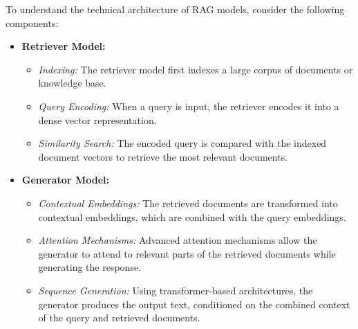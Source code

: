 To understand the technical architecture of RAG models, consider the following components:
\begin{itemize}
    \item \textbf{Retriever Model:}
    \begin{itemize}
        \item \textit{Indexing:} The retriever model first indexes a large corpus of documents or knowledge base.
        \item \textit{Query Encoding:} When a query is input, the retriever encodes it into a dense vector representation.
        \item \textit{Similarity Search:} The encoded query is compared with the indexed document vectors to retrieve the most relevant documents.
    \end{itemize}

    \item \textbf{Generator Model:}
    \begin{itemize}
        \item \textit{Contextual Embeddings:} The retrieved documents are transformed into contextual embeddings, which are combined with the query embeddings.
        \item \textit{Attention Mechanisms:} Advanced attention mechanisms allow the generator to attend to relevant parts of the retrieved documents while generating the response.
        \item \textit{Sequence Generation:} Using transformer-based architectures, the generator produces the output text, conditioned on the combined context of the query and retrieved documents.
    \end{itemize}
\end{itemize}

\newpage

